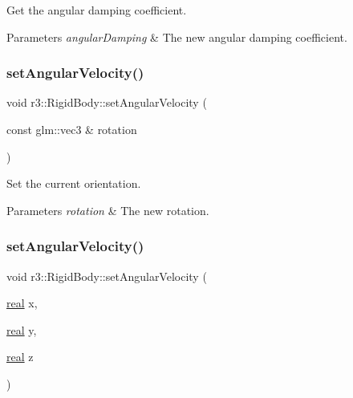 Get the angular damping coefficient. 


\begin{DoxyParams}{Parameters}
{\em angular\+Damping} & The new angular damping coefficient. \\
\hline
\end{DoxyParams}
\mbox{\label{classr3_1_1_rigid_body_af3fe9bbb0f1eda401c2a5cd02c915600}} 
\subsubsection{\texorpdfstring{set\+Angular\+Velocity()}{setAngularVelocity()}\hspace{0.1cm}{\footnotesize\ttfamily [1/2]}}
{\footnotesize\ttfamily void r3\+::\+Rigid\+Body\+::set\+Angular\+Velocity (\begin{DoxyParamCaption}\item[{const glm\+::vec3 \&}]{rotation }\end{DoxyParamCaption})}



Set the current orientation. 


\begin{DoxyParams}{Parameters}
{\em rotation} & The new rotation. \\
\hline
\end{DoxyParams}
\mbox{\label{classr3_1_1_rigid_body_a9b53314d9cc1a1dc26b9cc3312668b49}} 
\subsubsection{\texorpdfstring{set\+Angular\+Velocity()}{setAngularVelocity()}\hspace{0.1cm}{\footnotesize\ttfamily [2/2]}}
{\footnotesize\ttfamily void r3\+::\+Rigid\+Body\+::set\+Angular\+Velocity (\begin{DoxyParamCaption}\item[{\mbox{\hyperlink{namespacer3_ab2016b3e3f743fb735afce242f0dc1eb}{real}}}]{x,  }\item[{\mbox{\hyperlink{namespacer3_ab2016b3e3f743fb735afce242f0dc1eb}{real}}}]{y,  }\item[{\mbox{\hyperlink{namespacer3_ab2016b3e3f743fb735afce242f0dc1eb}{real}}}]{z }\end{DoxyParamCaption})}



